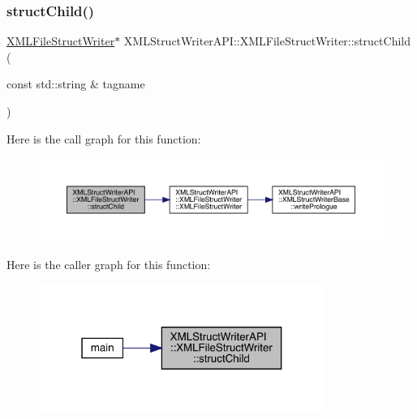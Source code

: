 \subsubsection{\texorpdfstring{structChild()}{structChild()}\hspace{0.1cm}{\footnotesize\ttfamily [1/3]}}
{\footnotesize\ttfamily \mbox{\hyperlink{classXMLStructWriterAPI_1_1XMLFileStructWriter}{X\+M\+L\+File\+Struct\+Writer}}$\ast$ X\+M\+L\+Struct\+Writer\+A\+P\+I\+::\+X\+M\+L\+File\+Struct\+Writer\+::struct\+Child (\begin{DoxyParamCaption}\item[{const std\+::string \&}]{tagname }\end{DoxyParamCaption})\hspace{0.3cm}{\ttfamily [inline]}}

Here is the call graph for this function\+:
\nopagebreak
\begin{figure}[H]
\begin{center}
\leavevmode
\includegraphics[width=350pt]{db/de3/classXMLStructWriterAPI_1_1XMLFileStructWriter_a29ff0f4353991294bab0c75ab8895f73_cgraph}
\end{center}
\end{figure}
Here is the caller graph for this function\+:
\nopagebreak
\begin{figure}[H]
\begin{center}
\leavevmode
\includegraphics[width=265pt]{db/de3/classXMLStructWriterAPI_1_1XMLFileStructWriter_a29ff0f4353991294bab0c75ab8895f73_icgraph}
\end{center}
\end{figure}
\mbox{\label{classXMLStructWriterAPI_1_1XMLFileStructWriter_a29ff0f4353991294bab0c75ab8895f73}} 
